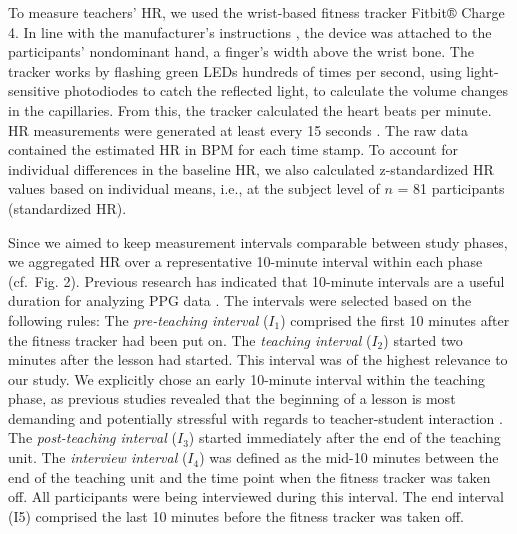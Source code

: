 \documentclass[preprint, 3p,
authoryear]{elsarticle} %
\begin{document}
To measure teachers' HR, we used the wrist-based fitness tracker Fitbit®
Charge 4. In line with the manufacturer's instructions \citep{fitbitnd},
the device was attached to the participants' nondominant hand, a
finger's width above the wrist bone. The tracker works by flashing green
LEDs hundreds of times per second, using light-sensitive photodiodes to
catch the reflected light, to calculate the volume changes in the
capillaries. From this, the tracker calculated the heart beats per
minute. HR measurements were generated at least every 15 seconds . The
raw data contained the estimated HR in BPM for each time stamp. To
account for individual differences in the baseline HR, we also
calculated z-standardized HR values based on individual means, i.e., at
the subject level of \(n\) = 81 participants (standardized HR).

Since we aimed to keep measurement intervals comparable between study
phases, we aggregated HR over a representative 10-minute interval within
each phase (cf.~Fig. 2). Previous research has indicated that 10-minute
intervals are a useful duration for analyzing PPG data
\citep{lu2008can}. The intervals were selected based on the following
rules: The \emph{pre-teaching interval} (\(I_1\)) comprised the first 10
minutes after the fitness tracker had been put on. The \emph{teaching
interval} (\(I_2\)) started two minutes after the lesson had started.
This interval was of the highest relevance to our study. We explicitly
chose an early 10-minute interval within the teaching phase, as previous
studies revealed that the beginning of a lesson is most demanding and
potentially stressful with regards to teacher-student interaction
\citep{donker2018, claessens2017positive}. The \emph{post-teaching
interval} (\(I_3\)) started immediately after the end of the teaching
unit. The \emph{interview interval} (\(I_4\)) was defined as the mid-10
minutes between the end of the teaching unit and the time point when the
fitness tracker was taken off. All participants were being interviewed
during this interval. The end interval (I5) comprised the last 10
minutes before the fitness tracker was taken off.

\renewcommand{\arraystretch}{1.5}
\end{document}
